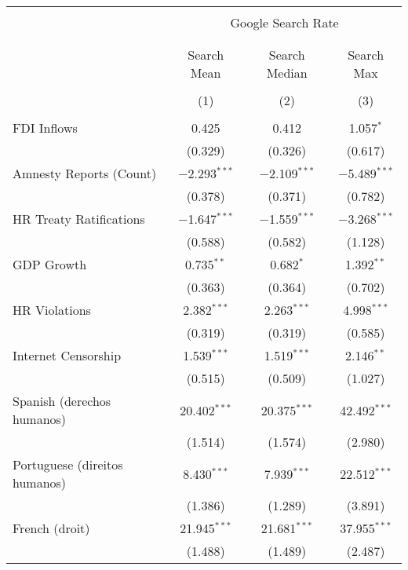 
\begin{table}[!htbp] \centering 
  \caption{} 
  \label{} 
\begin{tabular}{@{\extracolsep{5pt}}lccc} 
\\[-1.8ex]\hline 
\hline \\[-1.8ex] 
 & \multicolumn{3}{c}{Google Search Rate} \\ 
\cline{2-4} 
\\[-1.8ex] & \multicolumn{3}{c}{ } \\ 
 & Search Mean & Search Median & Search Max \\ 
\\[-1.8ex] & (1) & (2) & (3)\\ 
\hline \\[-1.8ex] 
 FDI Inflows & 0.425 & 0.412 & 1.057$^{*}$ \\ 
  & (0.329) & (0.326) & (0.617) \\ 
  Amnesty Reports (Count) & $-$2.293$^{***}$ & $-$2.109$^{***}$ & $-$5.489$^{***}$ \\ 
  & (0.378) & (0.371) & (0.782) \\ 
  HR Treaty Ratifications & $-$1.647$^{***}$ & $-$1.559$^{***}$ & $-$3.268$^{***}$ \\ 
  & (0.588) & (0.582) & (1.128) \\ 
  GDP Growth & 0.735$^{**}$ & 0.682$^{*}$ & 1.392$^{**}$ \\ 
  & (0.363) & (0.364) & (0.702) \\ 
  HR Violations & 2.382$^{***}$ & 2.263$^{***}$ & 4.998$^{***}$ \\ 
  & (0.319) & (0.319) & (0.585) \\ 
  Internet Censorship & 1.539$^{***}$ & 1.519$^{***}$ & 2.146$^{**}$ \\ 
  & (0.515) & (0.509) & (1.027) \\ 
  Spanish (derechos humanos) & 20.402$^{***}$ & 20.375$^{***}$ & 42.492$^{***}$ \\ 
  & (1.514) & (1.574) & (2.980) \\ 
  Portuguese (direitos humanos) & 8.430$^{***}$ & 7.939$^{***}$ & 22.512$^{***}$ \\ 
  & (1.386) & (1.289) & (3.891) \\ 
  French (droit) & 21.945$^{***}$ & 21.681$^{***}$ & 37.955$^{***}$ \\ 
  & (1.488) & (1.489) & (2.487) \\ 

\end{tabular}
\end{table}
